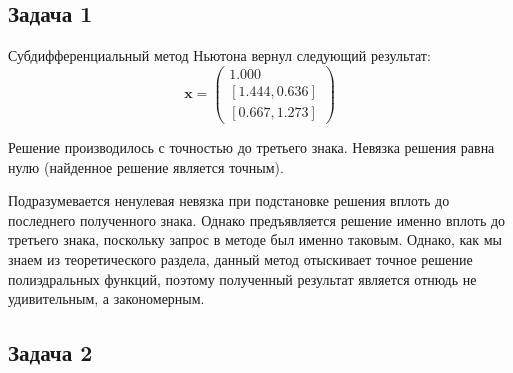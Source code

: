 \subsection{Задача 1}

Субдифференциальный метод Ньютона вернул следующий результат:
\begin{equation}
\mathbf{x} = 
\begin{pmatrix}
1.000 \\
[1.444, 0.636] \\
[0.667, 1.273]
\end{pmatrix}
\end{equation}

Решение производилось с точностью до третьего знака. Невязка решения равна нулю (найденное решение является точным).

\begin{remark}
	Подразумевается ненулевая невязка при подстановке решения вплоть до последнего полученного знака. Однако предъявляется решение именно вплоть до третьего знака, поскольку запрос в методе был именно таковым. Однако, как мы знаем из теоретического раздела, данный метод отыскивает точное решение полиэдральных функций, поэтому полученный результат является отнюдь не удивительным, а закономерным.
\end{remark}

\subsection{Задача 2}

